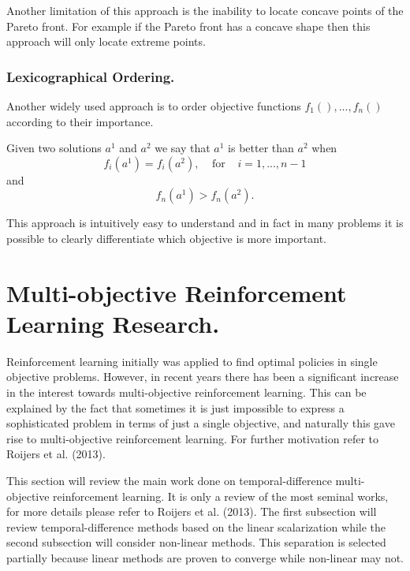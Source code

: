 Another limitation of this approach is the inability to locate concave points of the Pareto front. For example if the Pareto front has a concave shape then this approach will only locate extreme points.

\subsubsection{Lexicographical Ordering.}
Another widely used approach is to order objective functions $ f_{1}(),...,f_{n}() $ according to their importance.

Given two solutions $a^{1}$ and $a^{2}$ we say that $a^{1}$ is better than $a^{2}$ when $$ f_{i}(a^{1}) = f_{i}(a^{2}), \;\;\;\;\text{for}\;\;\;\; i = 1,...,n-1$$
and
$$ f_{n}(a^{1}) > f_{n}(a^{2}). $$

This approach is intuitively easy to understand and in fact in many problems it is possible to clearly differentiate which objective is more important.

\section{Multi-objective Reinforcement Learning Research.}

Reinforcement learning initially was applied to find optimal policies in single objective problems. However, in recent years there has been a significant increase in the interest towards multi-objective reinforcement learning. This can be explained by the fact that sometimes it is just impossible to express a sophisticated problem in terms of just a single objective, and naturally this gave rise to multi-objective reinforcement learning. For further motivation refer to Roijers et al. (2013)\nocite{roijers2013survey}.

This section will review the main work done on temporal-difference multi-objective reinforcement learning. It is only a review of the most seminal works, for more details please refer to Roijers et al. (2013)\nocite{roijers2013survey}. The first subsection will review temporal-difference methods based on the linear scalarization while the second subsection will consider non-linear methods. This separation is selected partially because linear methods are proven to converge while non-linear may not.

